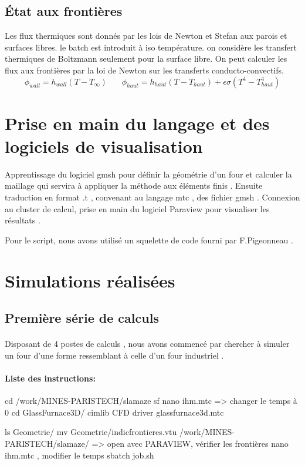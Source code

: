 \documentclass[12pt, a4paper, french, BCOR = 0pt, DIV = 10]{scrartcl}
\begin{document}
	\subsection{État aux frontières}
	
	Les flux thermiques sont donnés par les lois de Newton et Stefan aux parois et surfaces libres. le batch est introduit à iso température. on considère les transfert thermiques de Boltzmann seulement pour la surface libre.
	On peut calculer les flux aux frontières par la loi de Newton sur les transferts conducto-convectifs.\\ 
	\centering
	$$
	\phi_{wall} = h_{wall} (T - T_{\infty}) ~~~~~~~~	
	\phi_{haut} = h_{haut} (T - T_{haut}) + \epsilon \sigma (T^4 - T_{haut}^4)
	$$
	
	\section{Prise en main du langage et des logiciels de visualisation}
 	\raggedright
	Apprentissage du logiciel gmsh pour définir la géométrie d'un four et calculer la maillage qui servira à appliquer la méthode aux éléments finis . Ensuite traduction en format .t , convenant au langage mtc , des fichier gmsh . 
	Connexion au cluster de calcul, prise en main du logiciel Paraview pour visualiser les résultats .
	
	Pour le script, nous avons utilisé un squelette de code fourni par F.Pigeonneau .
	
	\section{Simulations réalisées}
	
	\subsection{Première série de calculs}
	\paragraph{}
	 Disposant de 4 postes de calculs , nous avons commencé par chercher à simuler un four  d'une forme ressemblant à celle d'un four industriel .
	 
	 \paragraph{Liste des instructions:}
	 cd /work/MINES-PARISTECH/slamaze
	 sf
	 nano ihm.mtc => changer le temps à 0
	 cd GlassFurnace3D/
	 cimlib CFD driver glassfurnace3d.mtc
	 
	 ls Geometrie/
	 mv Geometrie/indicfrontieres.vtu /work/MINES-PARISTECH/slamaze/ => open avec PARAVIEW, vérifier les frontières
	 nano ihm.mtc , modifier le temps
	 sbatch job.sh
	 
	
\end{document}
